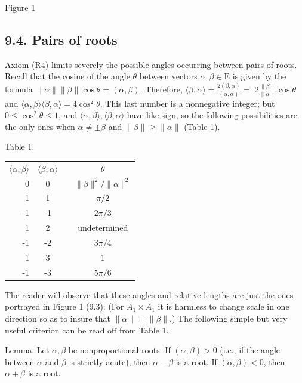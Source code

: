 \documentclass[10pt]{article}
\begin{document}
Figure 1

\subsection*{9.4. Pairs of roots}
Axiom (R4) limits severely the possible angles occurring between pairs of roots. Recall that the cosine of the angle $\theta$ between vectors $\alpha, \beta \in \mathrm{E}$ is given by the formula $\|\alpha\|\|\beta\| \cos \theta=(\alpha, \beta)$. Therefore, $\langle\beta, \alpha\rangle=\frac{2(\beta, \alpha)}{(\alpha, \alpha)}=$ $2 \frac{\|\beta\|}{\|\alpha\|} \cos \theta$ and $\langle\alpha, \beta\rangle\langle\beta, \alpha\rangle=4 \cos ^{2} \theta$. This last number is a nonnegative integer; but $0 \leq \cos ^{2} \theta \leq 1$, and $\langle\alpha, \beta\rangle,\langle\beta, \alpha\rangle$ have like sign, so the following possibilities are the only ones when $\alpha \neq \pm \beta$ and $\|\beta\| \geq\|\alpha\|$ (Table 1).

Table 1.

\begin{center}
\begin{tabular}{rcrc}
\hline
$\langle\alpha, \beta\rangle$ & $\langle\beta, \alpha\rangle$ &  & \multicolumn{1}{c}{$\theta$} \\
\cline { 1 - 2 }\cline { 4 - 5 }
0 & 0 &  & $\|\beta\|^{2} /\|\alpha\|^{2}$ \\
1 & 1 &  & $\pi / 2$ \\
-1 & -1 &  & $2 \pi / 3$ \\
1 & 2 &  & undetermined \\
-1 & -2 &  & $3 \pi / 4$ \\
1 & 3 &  & 1 \\
-1 & -3 &  & $5 \pi / 6$ \\
\hline
\end{tabular}
\end{center}

The reader will observe that these angles and relative lengths are just the ones portrayed in Figure 1 (9.3). (For $A_{1} \times A_{1}$ it is harmless to change scale in one direction so as to insure that $\|\alpha\|=\|\beta\|$.) The following simple but very useful criterion can be read off from Table 1.

Lemma. Let $\alpha, \beta$ be nonproportional roots. If $(\alpha, \beta)>0$ (i.e., if the angle between $\alpha$ and $\beta$ is strictly acute), then $\alpha-\beta$ is a root. If $(\alpha, \beta)<0$, then $\alpha+\beta$ is a root.
\end{document}
